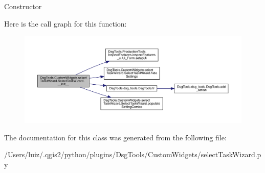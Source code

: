 \begin{DoxyVerb}Constructor
\end{DoxyVerb}
 Here is the call graph for this function\+:
\nopagebreak
\begin{figure}[H]
\begin{center}
\leavevmode
\includegraphics[width=350pt]{class_dsg_tools_1_1_custom_widgets_1_1select_task_wizard_1_1_select_task_wizard_a993df0d568b8e21d3fb2e24d3940081e_cgraph}
\end{center}
\end{figure}


The documentation for this class was generated from the following file\+:\begin{DoxyCompactItemize}
\item 
/\+Users/luiz/.\+qgis2/python/plugins/\+Dsg\+Tools/\+Custom\+Widgets/select\+Task\+Wizard.\+py\end{DoxyCompactItemize}
